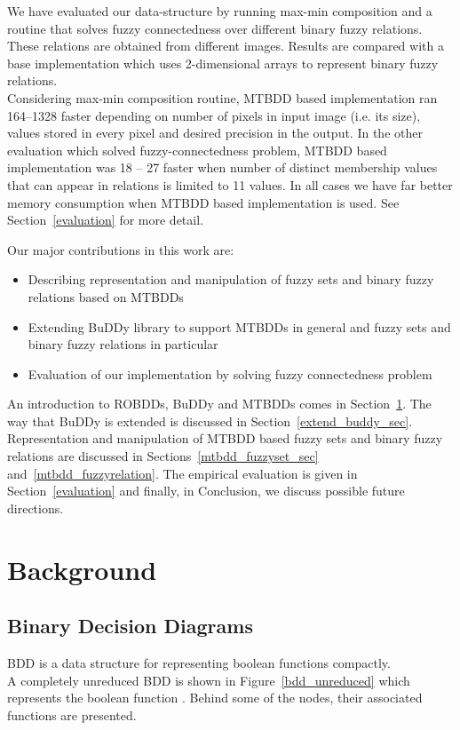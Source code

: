\documentclass[4pt]{article}
\begin{document}
We have evaluated our data-structure by running max-min composition and a routine that solves fuzzy connectedness over different binary fuzzy relations. These relations are obtained from different images. Results are compared with a base implementation which uses 2-dimensional arrays to represent binary fuzzy relations.\\
Considering max-min composition routine, MTBDD based implementation ran 164--1328 faster depending on number of pixels in input image (i.e. its size), values stored in every pixel and desired precision in the output.
In the other evaluation which solved fuzzy-connectedness problem, MTBDD based implementation was 18 -- 27 faster when number of distinct membership values that can appear in relations is limited to 11 values. In all cases we have far better memory consumption when MTBDD based implementation is used. See Section~\ref{evaluation} for more detail.

Our major contributions in this work are:
\begin{itemize}
\item Describing representation and manipulation of fuzzy sets and binary fuzzy relations based on MTBDDs
\item Extending BuDDy library to support MTBDDs in general and fuzzy sets and binary fuzzy relations in particular
\item Evaluation of our implementation by solving fuzzy connectedness problem 
\end{itemize}

An introduction to ROBDDs, BuDDy and MTBDDs comes in Section~\ref{background}. The way that BuDDy is extended is discussed in Section~\ref{extend_buddy_sec}. Representation and manipulation of MTBDD based fuzzy sets and binary fuzzy relations are discussed in Sections~\ref{mtbdd_fuzzyset_sec} and~\ref{mtbdd_fuzzyrelation}. The empirical evaluation is given in Section~\ref{evaluation} and finally, in Conclusion, we discuss possible future directions.

\section{Background}
\label{background}
\subsection{Binary Decision Diagrams}
\label{bdd_sec}
BDD is a data structure for representing boolean functions compactly.\\
A completely unreduced BDD is shown in Figure~\ref{bdd_unreduced} which represents the boolean function . Behind some of the nodes, their associated functions are presented.
\end{document}
